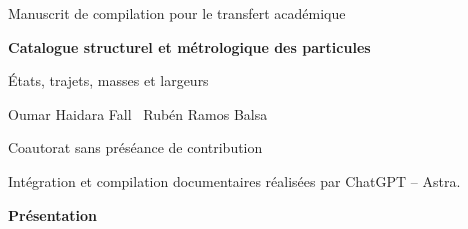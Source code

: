 \documentclass[a4paper,10pt]{article}
\begin{document}
\thispagestyle{plain}
\begin{center}
{\fontsize{10}{12}\selectfont Manuscrit de compilation pour le transfert académique\par}
\vspace{12mm}
{\fontsize{17}{20.5}\selectfont\bfseries Catalogue structurel et métrologique des particules\par}
\vspace{6pt}
{\fontsize{11}{13.5}\selectfont États, trajets, masses et largeurs\par}
\vspace{11pt}
{\fontsize{11.5}{14}\selectfont Oumar Haidara Fall \textperiodcentered\ Rubén Ramos Balsa\par}
\vspace{4pt}
{\fontsize{8}{10}\selectfont Coautorat sans préséance de contribution\par}
\vspace{3pt}
{\fontsize{7.5}{9.5}\selectfont Intégration et compilation documentaires réalisées par ChatGPT -- Astra.\par}
\end{center}
\vspace{7pt}
\begin{center}\bfseries Présentation\end{center}
\begingroup
\fontsize{10.5}{12.8}\selectfont
\setlength{\parskip}{2pt plus 1pt minus .5pt}
\noindent
\end{document}
